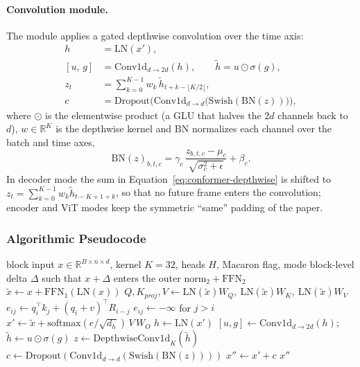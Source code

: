 \paragraph{Convolution module.} The module applies a gated depthwise convolution over the time axis:
\begin{align}
h &= \mathrm{LN}(x'), \\
[u,\, g] &= \mathrm{Conv1d}_{d \to 2d}(h), \qquad
\tilde{h} = u \odot \sigma(g), \label{eq:conformer-glu}\\
z_t &= \sum_{k=0}^{K-1} w_k\, \tilde{h}_{t + k - \lfloor K/2 \rfloor}, \label{eq:conformer-depthwise}\\
c &= \mathrm{Dropout}\Big(\mathrm{Conv1d}_{d \to d}\big(\mathrm{Swish}(\mathrm{BN}(z))\big)\Big), \label{eq:conformer-conv-out}
\end{align}
where $\odot$ is the elementwise product (a GLU that halves the $2d$ channels back to $d$), $w \in \mathbb{R}^{K}$ is the depthwise kernel and $\mathrm{BN}$ normalizes each channel over the batch and time axes,
\begin{equation}
\mathrm{BN}(z)_{b,t,c} = \gamma_c\,\frac{z_{b,t,c} - \mu_c}{\sqrt{\sigma_c^2 + \epsilon}} + \beta_c .
\label{eq:conformer-bn}
\end{equation}
In decoder mode the sum in Equation~\ref{eq:conformer-depthwise} is shifted to $z_t = \sum_{k=0}^{K-1} w_k \tilde{h}_{t-K+1+k}$, so that no future frame enters the convolution; encoder and ViT modes keep the symmetric ``same'' padding of the paper.

\subsubsection{Algorithmic Pseudocode}

\begin{algorithm}[H]
\caption{Conformer block (\texttt{conformer})}
\begin{algorithmic}[1]
\Require block input $x \in \mathbb{R}^{B \times n \times d}$, kernel $K=32$, heads $H$, Macaron flag, mode
\Ensure block-level delta $\Delta$ such that $x + \Delta$ enters the outer $\mathrm{norm}_2 + \mathrm{FFN}_2$
\State $\tilde{x} \gets x + \mathrm{FFN}_1(\mathrm{LN}(x))$ 
\State $Q, K_{proj}, V \gets \mathrm{LN}(\tilde{x})W_Q,\ \mathrm{LN}(\tilde{x})W_K,\ \mathrm{LN}(\tilde{x})W_V$
\State $e_{ij} \gets q_i^{\top}k_j + (q_i + v)^{\top}R_{i-j}$ 
    \State $e_{ij} \gets -\infty$ for $j > i$ 
\EndIf
\State $x' \gets \tilde{x} + \mathrm{softmax}(e/\sqrt{d_h})\,V\,W_O$
\State $h \gets \mathrm{LN}(x')$
\State $[u, g] \gets \mathrm{Conv1d}_{d \to 2d}(h)$; \quad $\tilde{h} \gets u \odot \sigma(g)$ 
\State $z \gets \mathrm{DepthwiseConv1d}_{K}(\tilde{h})$ 
\State $c \gets \mathrm{Dropout}(\mathrm{Conv1d}_{d \to d}(\mathrm{Swish}(\mathrm{BN}(z))))$
\State $x'' \gets x' + c$
\State \Return $x''$ 
\end{algorithmic}
\end{algorithm}

